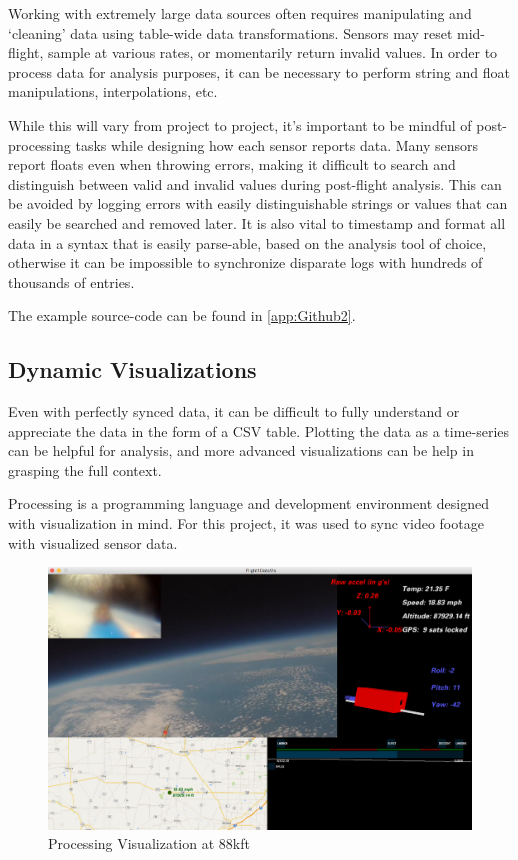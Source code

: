 \documentclass[heading.tex]{subfiles}
\begin{document}
Working with extremely large data sources often requires manipulating and
`cleaning' data using table-wide data transformations. Sensors may reset
mid-flight, sample at various rates, or momentarily return invalid values.
In order to process data for analysis purposes, it can be necessary to perform
string and float manipulations, interpolations, etc.

While this will vary from project to project, it's important to be mindful of
post-processing tasks while designing how each sensor reports data.
Many sensors report floats even when throwing errors, making it difficult to
search and distinguish between valid and invalid values during post-flight
analysis. This can be avoided by logging errors with easily distinguishable
strings or values that can easily be searched and removed later. It is also
vital to timestamp and format all data in a syntax that is easily parse-able,
based on the analysis tool of choice, otherwise it can be
impossible to synchronize disparate logs with hundreds of thousands of entries.

The example source-code can be found in \cref{app:Github2}.

\subsection{Dynamic Visualizations}

Even with perfectly synced data, it can be difficult to fully understand or 
appreciate the data in the form of a CSV table. Plotting the data as a
time-series can be helpful for analysis, and more advanced visualizations can
be help in grasping the full context.

Processing is a programming language and development environment designed
with visualization in mind. For this project, it was used to sync video
footage with visualized sensor data. 

\begin{figure}[hbtp]
\centering
\includegraphics[width=1\textwidth]{images/space.png}
 \caption{Processing Visualization at 88kft}
\label{f:processing}
\end{figure}
\end{document}
